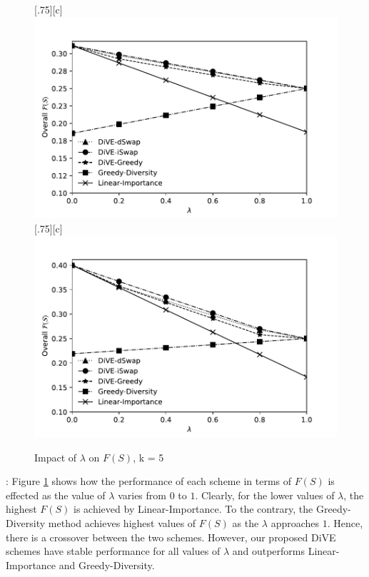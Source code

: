 \begin{figure}[t]
	\centering
	[.75\linewidth][c]{%
		\includegraphics[width=.75\linewidth]{figures/results/tradeoff_heart_2}} \\
		[.75\linewidth][c]{%
		\includegraphics[width=.75\linewidth]{figures/results/tradeoff_flights}}
										\vspace{-10pt}				
	\caption{Impact of $\lambda$ on $F\left(S\right)$, k = 5}
	\label{fig:tradeoff_3_datasets}	
	\end{figure}






{:}
Figure \ref{fig:tradeoff_3_datasets} shows how the performance of each scheme in terms of $F\left(S\right)$ is effected as the value of  $\lambda$ varies from $0$ to $1$. Clearly, for the lower values of $\lambda$, the highest $F(S)$ is achieved by Linear-Importance. To the contrary, the Greedy-Diversity method achieves highest values of $F\left(S\right)$ as the $\lambda$ approaches $1$. 
Hence, there is a crossover between the two schemes. 
However, our proposed DiVE schemes have stable performance for all values of $\lambda$ and outperforms Linear-Importance and Greedy-Diversity. 


